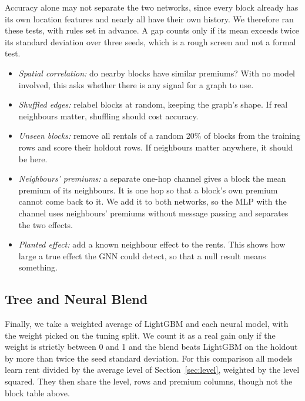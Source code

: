 Accuracy alone may not separate the two networks, since every block already has its own location features and nearly all have their own history. We therefore ran these tests, with rules set in advance. A gap counts only if its mean exceeds twice its standard deviation over three seeds, which is a rough screen and not a formal test.

\begin{itemize}
\item \emph{Spatial correlation:} do nearby blocks have similar premiums? With no model involved, this asks whether there is any signal for a graph to use.
\item \emph{Shuffled edges:} relabel blocks at random, keeping the graph's shape. If real neighbours matter, shuffling should cost accuracy.
\item \emph{Unseen blocks:} remove all rentals of a random 20\% of blocks from the training rows and score their holdout rows. If neighbours matter anywhere, it should be here.
\item \emph{Neighbours' premiums:} a separate one-hop channel gives a block the mean premium of its neighbours. It is one hop so that a block's own premium cannot come back to it. We add it to both networks, so the MLP with the channel uses neighbours' premiums without message passing and separates the two effects.
\item \emph{Planted effect:} add a known neighbour effect to the rents. This shows how large a true effect the GNN could detect, so that a null result means something.
\end{itemize}

\subsection{Tree and Neural Blend}
\label{sec:blend}

Finally, we take a weighted average of LightGBM and each neural model, with the weight picked on the tuning split. We count it as a real gain only if the weight is strictly between 0 and 1 and the blend beats LightGBM on the holdout by more than twice the seed standard deviation. For this comparison all models learn rent divided by the average level of Section~\ref{sec:level}, weighted by the level squared. They then share the level, rows and premium columns, though not the block table above.

